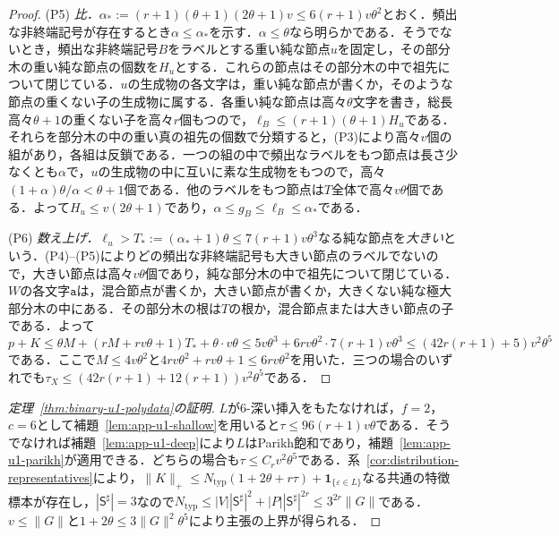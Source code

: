 \documentclass[11pt,a4paper]{ltjsarticle}
\numberwithin{equation}{section}
\theoremstyle{plain}
\theoremstyle{definition}
\theoremstyle{remark}
\newcommand{\eps}{\varepsilon}
\begin{document}
\begin{proof}
(P5) \emph{比．}$\alpha_*:=(r+1)(\theta+1)(2\theta+1)v\le6(r+1)v\theta^2$とおく．頻出な非終端記号が存在するとき$\alpha\le\alpha_*$を示す．$\alpha\le\theta$なら明らかである．そうでないとき，頻出な非終端記号$B$をラベルとする重い純な節点$u$を固定し，その部分木の重い純な節点の個数を$H_u$とする．これらの節点はその部分木の中で祖先について閉じている．$u$の生成物の各文字は，重い純な節点が書くか，そのような節点の重くない子の生成物に属する．各重い純な節点は高々$\theta$文字を書き，総長高々$\theta+1$の重くない子を高々$r$個もつので，$\ell_B\le(r+1)(\theta+1)H_u$である．それらを部分木の中の重い真の祖先の個数で分類すると，(P3)により高々$v$個の組があり，各組は反鎖である．一つの組の中で頻出なラベルをもつ節点は長さ少なくとも$\alpha$で，$u$の生成物の中に互いに素な生成物をもつので，高々$(1+\alpha)\theta/\alpha<\theta+1$個である．他のラベルをもつ節点は$T$全体で高々$v\theta$個である．よって$H_u\le v(2\theta+1)$であり，$\alpha\le g_B\le\ell_B\le\alpha_*$である．

(P6) \emph{数え上げ．}$\ell_u>T_*:=(\alpha_*+1)\theta\le7(r+1)v\theta^3$なる純な節点を\emph{大きい}という．(P4)--(P5)によりどの頻出な非終端記号も大きい節点のラベルでないので，大きい節点は高々$v\theta$個であり，純な部分木の中で祖先について閉じている．$W$の各文字$\mathtt a$は，混合節点が書くか，大きい節点が書くか，大きくない純な極大部分木の中にある．その部分木の根は$T$の根か，混合節点または大きい節点の子である．よって
\[
 p+K\le\theta M+(rM+rv\theta+1)T_*+\theta\cdot v\theta
 \le5v\theta^3+6rv\theta^2\cdot7(r+1)v\theta^3\le(42r(r+1)+5)v^2\theta^5
\]
である．ここで$M\le4v\theta^2$と$4rv\theta^2+rv\theta+1\le6rv\theta^2$を用いた．三つの場合のいずれでも$\tau_X\le(42r(r+1)+12(r+1))v^2\theta^5$である．
\end{proof}

\begin{proof}[定理~\ref{thm:binary-u1-polydata}の証明]
$L$が$6$-深い挿入をもたなければ，$f=2$，$c=6$として補題~\ref{lem:app-u1-shallow}を用いると$\tau\le96(r+1)v\theta$である．そうでなければ補題~\ref{lem:app-u1-deep}により$L$はParikh飽和であり，補題~\ref{lem:app-u1-parikh}が適用できる．どちらの場合も$\tau\le C_rv^2\theta^5$である．系~\ref{cor:distribution-representatives}により，$\|K\|_+\le N_{\mathrm{typ}}(1+2\theta+r\tau)+\mathbf 1_{\{\eps\in L\}}$なる共通の特徴標本が存在し，$|\mathsf S^\sharp|=3$なので$N_{\mathrm{typ}}\le|V||\mathsf S^\sharp|^2+|P||\mathsf S^\sharp|^{2r}\le3^{2r}\|G\|$である．$v\le\|G\|$と$1+2\theta\le3\|G\|^2\theta^5$により主張の上界が得られる．
\end{proof}
\end{document}
